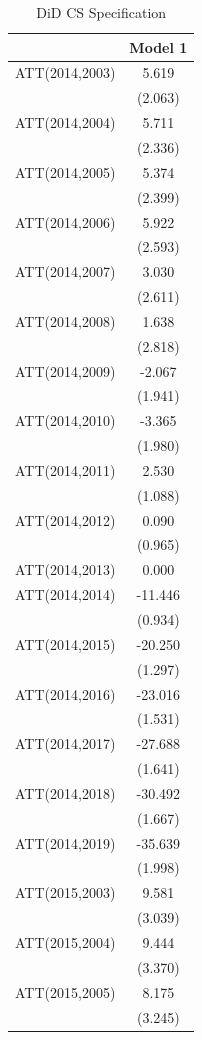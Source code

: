 \documentclass[
  12pt,
]{article}
\begin{document}
\begin{table}

\caption{\label{tab:Tab-6}DiD CS Specification}
\centering
\begin{tabular}[t]{lc}
\toprule
  & Model 1\\
\midrule
ATT(2014,2003) & 5.619\\
 & (2.063)\\
ATT(2014,2004) & 5.711\\
 & (2.336)\\
ATT(2014,2005) & 5.374\\
 & (2.399)\\
ATT(2014,2006) & 5.922\\
 & (2.593)\\
ATT(2014,2007) & 3.030\\
 & (2.611)\\
ATT(2014,2008) & 1.638\\
 & (2.818)\\
ATT(2014,2009) & -2.067\\
 & (1.941)\\
ATT(2014,2010) & -3.365\\
 & (1.980)\\
ATT(2014,2011) & 2.530\\
 & (1.088)\\
ATT(2014,2012) & 0.090\\
 & (0.965)\\
ATT(2014,2013) & 0.000\\
ATT(2014,2014) & -11.446\\
 & (0.934)\\
ATT(2014,2015) & -20.250\\
 & (1.297)\\
ATT(2014,2016) & -23.016\\
 & (1.531)\\
ATT(2014,2017) & -27.688\\
 & (1.641)\\
ATT(2014,2018) & -30.492\\
 & (1.667)\\
ATT(2014,2019) & -35.639\\
 & (1.998)\\
ATT(2015,2003) & 9.581\\
 & (3.039)\\
ATT(2015,2004) & 9.444\\
 & (3.370)\\
ATT(2015,2005) & 8.175\\
 & (3.245)\\

\end{tabular}
\end{table}
\end{document}
